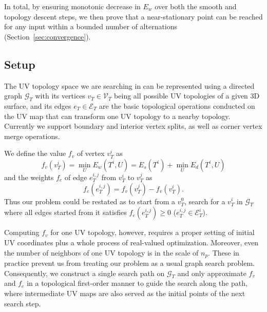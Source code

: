 In total, by ensuring monotonic decrease in $E_w$ over both the smooth and topology descent steps, we then prove that a near-stationary point can be reached for any input within a bounded number of alternations (Section~\ref{sec:convergence}).  

\subsection{Setup}


The UV topology space we are searching in can be represented using a directed graph $\mathcal{G}_T$ with its vertices $v_T \in \mathcal{V}_T$ being all possible UV topologies of a given 3D surface, and its edges $e_T \in \mathcal{E}_T$ are the basic topological operations conducted on the UV map that can transform one UV topology to a nearby topology. Currently we support boundary and interior vertex splits, as well as corner vertex merge operations.  

We define the value $f_v$ of vertex $v^i_T$ as 
\[ f_v(v^i_T) = \min_{U} E_w(T^i, U) = E_s(T^i) + \min_{U} E_d(T^i, U) \]
and the weights $f_e$ of edge $e^{i,j}_{T}$ from $v^i_T$ to $v^j_T$ as 
\[ f_e(e^{i,j}_T) = f_v(v^j_T) - f_v(v^i_T). \]
Thus our problem could be restated as to start from a $v^0_T$, search for a $v^i_T$ in $\mathcal{G}_T$ where all edges started from it satisfies $f_e(e^{i,j}_T) \geq 0$ ($e^{i,j}_T \in \mathcal{E}^i_T$).

Computing $f_v$ for one UV topology, however, requires a proper setting of initial UV coordinates plus a whole process of real-valued optimization. Moreover, even the number of neighbors of one UV topology is in the scale of $n_p$. These in practice prevent us from treating our problem as a usual graph search problem. Consequently, we construct a single search path on $\mathcal{G}_T$ and only approximate $f_v$ and $f_e$ in a topological first-order manner to guide the search along the path, where intermediate UV maps are also served as the initial points of the next search step.


